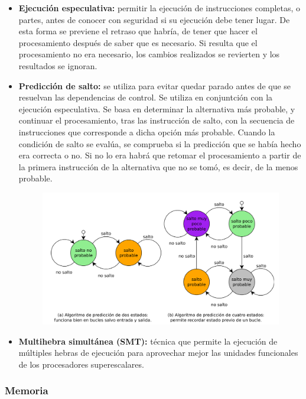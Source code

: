 \documentclass{article}
\begin{document}
\begin{itemize}
\item \textbf{Ejecución especulativa:} permitir la ejecución de instrucciones completas, o partes, antes de conocer con seguridad si su ejecución debe tener lugar. De esta forma se previene el retraso que habría, de tener que hacer el procesamiento después de saber que es necesario. Si resulta que el procesamiento no era necesario, los cambios realizados se revierten y los resultados se ignoran.

\item \textbf{Predicción de salto:} se utiliza para evitar quedar parado antes de que se resuelvan las dependencias de control. Se utiliza en conjuntción con la ejecución especulativa. Se basa en determinar la alternativa más probable, y continuar el procesamiento, tras las instrucción de salto, con la secuencia de instrucciones que corresponde a dicha opción más probable. Cuando la condición de salto se evalúa, se comprueba si la predicción que se había hecho era correcta o no. Si no lo era habrá que retomar el procesamiento a partir de la primera instrucción de la alternativa que no se tomó, es decir, de la menos probable.

\begin{figure}[h]
\centering
\includegraphics[scale=1,width=\textwidth]{predicionsalto.png}
\end{figure}

\item \textbf{Multihebra simultánea (SMT):} técnica que permite la ejecución de múltiples hebras de ejecución para aprovechar mejor las unidades funcionales de los procesadores superescalares.
\end{itemize}

\subsubsection{Memoria}
\end{document}

